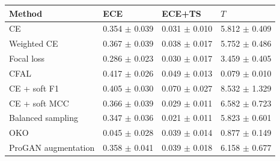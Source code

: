 \begin{tabular}{llll}
\toprule
Method & ECE & ECE+TS & $T$\\
\midrule
CE & \num{0.354} $\pm$ \num{0.039} & \num{0.031} $\pm$ \num{0.010} & \num{5.812} $\pm$ \num{0.409}\\
Weighted CE & \num{0.367} $\pm$ \num{0.039} & \num{0.038} $\pm$ \num{0.017} & \num{5.752} $\pm$ \num{0.486}\\
Focal loss & \num{0.286} $\pm$ \num{0.023} & \num{0.030} $\pm$ \num{0.017} & \num{3.459} $\pm$ \num{0.405}\\
CFAL & \num{0.417} $\pm$ \num{0.026} & \num{0.049} $\pm$ \num{0.013} & \num{0.079} $\pm$ \num{0.010}\\
CE + soft F1 & \num{0.405} $\pm$ \num{0.030} & \num{0.070} $\pm$ \num{0.027} & \num{8.532} $\pm$ \num{1.329}\\
CE + soft MCC & \num{0.366} $\pm$ \num{0.039} & \num{0.029} $\pm$ \num{0.011} & \num{6.582} $\pm$ \num{0.723}\\
Balanced sampling & \num{0.347} $\pm$ \num{0.036} & \num{0.021} $\pm$ \num{0.011} & \num{5.823} $\pm$ \num{0.601}\\
OKO & \num{0.045} $\pm$ \num{0.028} & \num{0.039} $\pm$ \num{0.014} & \num{0.877} $\pm$ \num{0.149}\\
ProGAN augmentation & \num{0.358} $\pm$ \num{0.041} & \num{0.039} $\pm$ \num{0.018} & \num{6.158} $\pm$ \num{0.677}\\
\bottomrule
\end{tabular}
